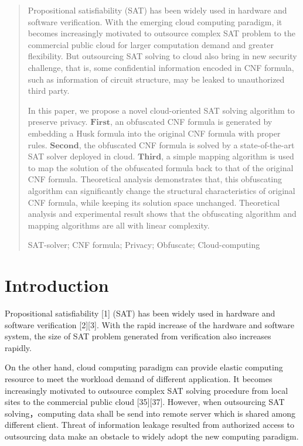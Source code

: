 \documentclass[runningheads,a4paper]{llncs}
\newcommand{\keywords}[1]{\par\addvspace\baselineskip
\noindent\keywordname\enspace\ignorespaces#1}
\begin{document}
\begin{abstract}

\setlength{\parindent}{2em}

Propositional satisfiability (SAT) has been widely used in hardware and software verification. 
With the emerging cloud computing paradigm, 
it becomes increasingly motivated to outsource complex SAT problem to the commercial public cloud for larger computation demand and greater flexibility. 
But outsourcing SAT solving to cloud also bring in new security challenge, that is, some confidential information encoded in CNF formula, such as information of circuit structure, 
may be leaked to unauthorized third party.

In this paper, we propose a novel cloud-oriented SAT solving algorithm to preserve privacy.
$\mathbf{First}$, an obfuscated CNF formula is generated by embedding a Husk formula into the original CNF formula with proper rules.
$\mathbf{Second}$, the obfuscated CNF formula is solved by a state-of-the-art SAT solver deployed in cloud.
$\mathbf{Third}$, a simple mapping algorithm is used to map the solution of the obfuscated formula back to that of the original CNF formula. 
Theoretical analysis demonstrates that, this obfuscating algorithm can significantly change the structural characteristics of original CNF formula, 
while keeping its solution space unchanged.
Theoretical analysis and experimental result shows that the obfuscating algorithm and mapping algorithms are all with linear complexity.

\keywords{SAT-solver; CNF formula; Privacy; Obfuscate; Cloud-computing}
\end{abstract}

\section{Introduction}

\setlength{\parindent}{2em}Propositional satisfiability [1] (SAT) has been widely used in hardware and software verification [2][3]. With the rapid increase of the hardware and software system, the size of SAT problem generated from verification also increases rapidly. 

On the other hand, cloud computing paradigm can provide elastic computing resource to meet the workload demand of different application. It becomes increasingly motivated to outsource complex SAT solving procedure from local sites to the commercial public cloud [35][37]. However, when outsourcing SAT solving，computing data shall be send into remote server which is shared among different client. Threat of information leakage resulted from authorized access to outsourcing data make an obstacle to widely adopt the new computing paradigm. 
\end{document}
